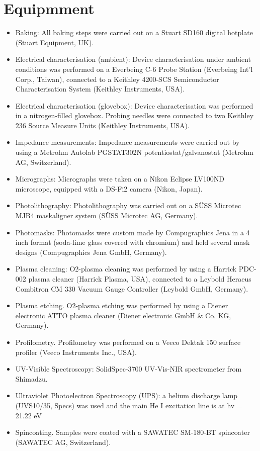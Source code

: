 \section{Equipmment}
\begin{itemize}
\item Baking: All baking steps were carried out on a Stuart SD160 digital hotplate (Stuart Equipment, UK). 
\item Electrical characterisation (ambient): Device characterisation under ambient conditions was performed on a Everbeing C-6 Probe Station (Everbeing Int’l Corp., Taiwan), connected to a Keithley 4200-SCS Semiconductor Characterisation System (Keithley Instruments, USA). 
\item Electrical characterisation (glovebox): Device characterisation was performed in a nitrogen-filled glovebox. Probing needles were connected to two Keithley 236 Source Measure Units (Keithley Instruments, USA). 
\item Impedance measurements: Impedance measurements were carried out by using a Metrohm Autolab PGSTAT302N potentiostat/galvanostat (Metrohm AG, Switzerland). 
\item Micrographs: Micrographs were taken on a Nikon Eclipse LV100ND microscope, equipped with a DS-Fi2 camera (Nikon, Japan). 
\item Photolithography: Photolithography was carried out on a SÜSS Microtec MJB4 maskaligner system (SÜSS Microtec AG, Germany). 
\item Photomasks: Photomasks were custom made by Compugraphics Jena in a 4 inch format (soda-lime glass covered with chromium) and held several mask designs (Compugraphics Jena GmbH, Germany). 
\item Plasma cleaning: O2-plasma cleaning was performed by using a Harrick PDC-002 plasma cleaner (Harrick Plasma, USA), connected to a Leybold Heraeus Combitron CM 330 Vacuum Gauge Controller (Leybold GmbH, Germany). 
\item Plasma etching. O2-plasma etching was performed by using a Diener electronic ATTO plasma cleaner (Diener electronic GmbH \& Co. KG, Germany). 
\item Profilometry. Profilometry was performed on a Veeco Dektak 150 surface profiler (Veeco Instruments Inc., USA).
\item UV-Visible Spectroscopy: SolidSpec-3700 UV-Vis-NIR spectrometer from Shimadzu.
\item Ultraviolet Photoelectron Spectroscopy (UPS): a helium discharge lamp (UVS10/35, Specs) was used and the main He I excitation line is at hv = 21.22 eV
\item Spincoating. Samples were coated with a SAWATEC SM-180-BT spincoater (SAWATEC AG, Switzerland).
\end{itemize}

